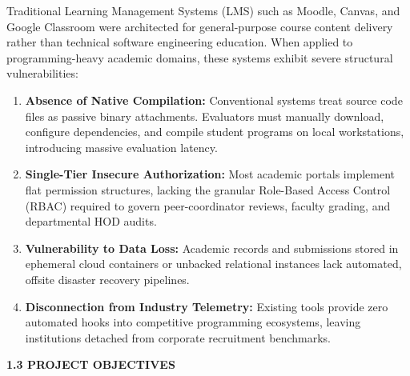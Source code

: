 {Traditional Learning Management Systems (LMS) such as Moodle, Canvas, and Google Classroom were architected for general-purpose course content delivery rather than technical software engineering education. When applied to programming-heavy academic domains, these systems exhibit severe structural vulnerabilities:
\begin{enumerate}[noitemsep,topsep=3pt,leftmargin=*]
  \item \textbf{Absence of Native Compilation:} Conventional systems treat source code files as passive binary attachments. Evaluators must manually download, configure dependencies, and compile student programs on local workstations, introducing massive evaluation latency.
  \item \textbf{Single-Tier Insecure Authorization:} Most academic portals implement flat permission structures, lacking the granular Role-Based Access Control (RBAC) required to govern peer-coordinator reviews, faculty grading, and departmental HOD audits.
  \item \textbf{Vulnerability to Data Loss:} Academic records and submissions stored in ephemeral cloud containers or unbacked relational instances lack automated, offsite disaster recovery pipelines.
  \item \textbf{Disconnection from Industry Telemetry:} Existing tools provide zero automated hooks into competitive programming ecosystems, leaving institutions detached from corporate recruitment benchmarks.
\end{enumerate}

\vspace{0.4cm}
{\fontsize{14pt}{18pt}\selectfont\bfseries 1.3 PROJECT OBJECTIVES\par}
\vspace{0.3cm}

}
